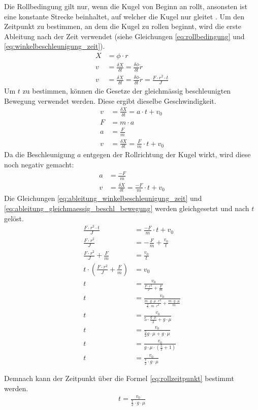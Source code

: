 Die Rollbedingung gilt nur, wenn die Kugel von Beginn an rollt, ansonsten ist eine konstante Strecke beinhaltet,
auf welcher die Kugel nur gleitet \cite{rollzeitpunkt}. Um den Zeitpunkt zu bestimmen, an dem die Kugel zu rollen
beginnt, wird die erste Ableitung nach der Zeit verwendet (siehe Gleichungen \ref{eq:rollbedingung} und \ref{eq:winkelbeschleunigung_zeit}).
\begin{align}
    X &= \phi \cdot r\\
    v &= \frac{\delta X}{\delta t} = \frac{\delta \phi}{\delta t} \dot r\\
    v &= \frac{\delta X}{\delta t} = \frac{\delta \phi}{\delta t} \dot r = \frac{F \cdot r^2 \cdot t}{J}\label{eq:ableitung_winkelbeschleunigung_zeit}
\end{align}
Um $t$ zu bestimmen, können die Gesetze der gleichmässig beschleunigten Bewegung verwendet werden. Diese ergibt dieselbe Geschwindigkeit.
\begin{align}
    v &= \frac{\delta X}{\delta t} = a \cdot t + v_0\\
    F &= m \cdot a\\
    a &= \frac{F}{m}\\
    v &= \frac{\delta X}{\delta t} = \frac{F}{m} \cdot t + v_0
\end{align}
Da die Beschleunigung $a$ entgegen der Rollrichtung der Kugel wirkt, wird diese noch negativ gemacht:
\begin{align}
    a &= \frac{-F}{m}\\
    v &= \frac{\delta X}{\delta t} = \frac{-F}{m} \cdot t + v_0\label{eq:ableitung_gleichmaessig_beschl_bewegung}
\end{align}
Die Gleichungen \ref{eq:ableitung_winkelbeschleunigung_zeit} und \ref{eq:ableitung_gleichmaessig_beschl_bewegung} werden gleichgesetzt und nach $t$ gelöst.
\begin{align}
    \frac{F \cdot r^2 \cdot t}{J} &= \frac{-F}{m} \cdot t + v_0\\
    \frac{F \cdot r^2}{J} &= -\frac{F}{m} + \frac{v_0}{t}\\
    \frac{F \cdot r^2}{J} + \frac{F}{m} &= \frac{v_0}{t}\\
    t \cdot (\frac{F \cdot r^2}{J} + \frac{F}{m}) &= v_0\\
    t &= \frac{v_0}{\frac{F \cdot r^2}{J} + \frac{F}{m}}\\
    t &= \frac{v_0}{\frac{m \cdot g \cdot \mu \cdot r^2}{\frac{2}{5} \cdot m \cdot r^2} + \frac{m \cdot g \cdot \mu}{m}}\\
    t &= \frac{v_0}{5 \cdot \frac{g \cdot \mu}{2} + g \cdot \mu}\\
    t &= \frac{v_0}{\frac{5}{2} g \cdot \mu + g \cdot \mu}\\
    t &= \frac{v_0}{g \cdot \mu \cdot (\frac{5}{2} + 1)}\\
    t &= \frac{v_0}{\frac{7}{2} \cdot g \cdot \mu}
\end{align}

Demnach kann der Zeitpunkt über die Formel \ref{eq:rollzeitpunkt} bestimmt werden.
\begin{align}
    t = \frac{v_0}{\frac{7}{2} \cdot g \cdot \mu}\label{eq:rollzeitpunkt}
\end{align}